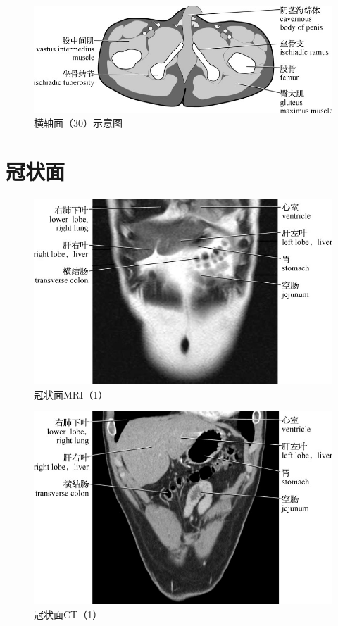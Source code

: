 \begin{figure}[!htbp]
 \centering
 \includegraphics{./images/Image00091.jpg}
 \captionsetup{justification=centering}
 \caption{横轴面（30）示意图}
  \end{figure} 
 \FloatBarrier

\section{冠状面}

\begin{figure}[!htbp]
 \centering
 \includegraphics{./images/Image00092.jpg}
 \captionsetup{justification=centering}
 \caption{冠状面MRI（1）}
  \end{figure} 
 \FloatBarrier

\begin{figure}[!htbp]
 \centering
 \includegraphics{./images/Image00093.jpg}
 \captionsetup{justification=centering}
 \caption{冠状面CT（1）}
  \end{figure} 
 \FloatBarrier

